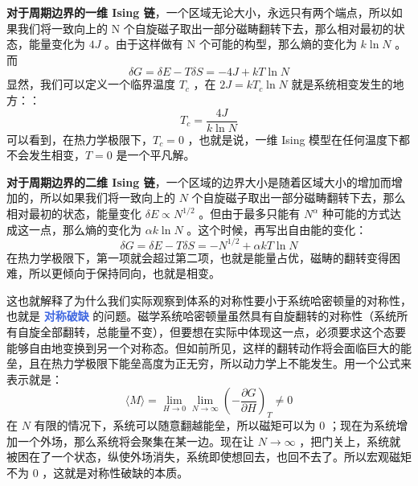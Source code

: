 \textbf{\kaishu 对于周期边界的一维 Ising 链}，一个区域无论大小，永远只有两个端点，所以如果我们将一致向上的 N 个自旋磁子取出一部分磁畴翻转下去，那么相对最初的状态，能量变化为 $4J$ 。由于这样做有 N 个可能的构型，那么熵的变化为 $k\ln N$ 。而 
\[
    \delta G = \delta E - T\delta S = -4J + kT\ln N
\]
显然，我们可以定义一个临界温度 $T_c$ ，在 $2J = kT_c \ln N$ 就是系统相变发生的地方：：
\begin{equation}\label{equ:一维Ising模型的临界温度}
    T_c = \frac{4J}{k\ln N}
\end{equation}
可以看到，在热力学极限下，$T_c = 0$ ，也就是说，一维 Ising 模型在任何温度下都不会发生相变，$T = 0$ 是一个平凡解。

\textbf{\kaishu 对于周期边界的二维 Ising 链}，一个区域的边界大小是随着区域大小的增加而增加的，所以如果我们将一致向上的 $N$ 个自旋磁子取出一部分磁畴翻转下去，那么相对最初的状态，能量变化 $\delta E \propto N^{1/2}$ 。但由于最多只能有 $N^\alpha$ 种可能的方式达成这一点，那么熵的变化为 $\alpha k\ln N$ 。这个时候，再写出自由能的变化：
\[
    \delta G = \delta E - T\delta S = -N^{1/2} + \alpha kT\ln N
\]
在热力学极限下，第一项就会超过第二项，也就是能量占优，磁畴的翻转变得困难，所以更倾向于保持同向，也就是相变。

这也就解释了为什么我们实际观察到体系的对称性要小于系统哈密顿量的对称性，也就是 \textcolor{RoyalBlue}{\textbf{\kaishu 对称破缺}} 的问题。磁学系统哈密顿量虽然具有自旋翻转的对称性（系统所有自旋全部翻转，总能量不变），但要想在实际中体现这一点，必须要求这个态要能够自由地变换到另一个对称态。但如前所见，这样的翻转动作将会面临巨大的能垒，且在热力学极限下能垒高度为正无穷，所以动力学上不能发生。用一个公式来表示就是：
\begin{equation}\label{equ:对称性破缺}
    \langle M \rangle  = \lim_{H\rightarrow 0}  \lim_{N\rightarrow \infty} \left(-\frac{\partial G}{\partial H}\right)_T \neq 0  
\end{equation}
在 $N$ 有限的情况下，系统可以随意翻越能垒，所以磁矩可以为 $0$ ；现在为系统增加一个外场，那么系统将会聚集在某一边。现在让 $N\rightarrow \infty$ ，把门关上，系统就被困在了一个状态，纵使外场消失，系统即使想回去，也回不去了。所以宏观磁矩不为 $0$ ，这就是对称性破缺的本质。
